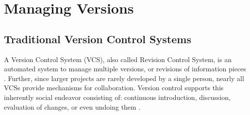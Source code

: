 	
\section{Managing Versions}
	\subsection{Traditional Version Control Systems}
	\label{sec:background:manage-versions:traditional-vcs}
	
	A Version Control System (VCS), also called Revision Control System, is an automated system to manage multiple versions, or revisions of information pieces \citep{OSullivan2009}.
	Further, since larger projects are rarely developed by a single person, nearly all VCSs provide mechanisms for collaboration. Version control supports this inherently social endeavor consisting of: continuous introduction, discussion, evaluation of changes, or even undoing them \citep{Collins-Sussman2004}.


